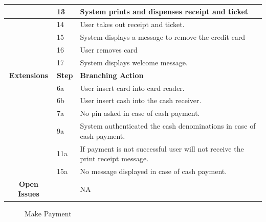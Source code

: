 \documentclass[a4paper,12pt]{report}
\begin{document}
\begin{tabular}{ | c | p{2cm} | p{7cm} |}
	\hline
	&  13  & System prints and dispenses receipt and ticket \\
	\hline
	&  14  & User takes out receipt and ticket. \\
	\hline
	&  15  & System displays a message to remove the credit card \\
	\hline
	&  16  & User removes card \\
	\hline
	&  17  & System displays welcome message. \\
	\hline
	
	\textbf{Extensions} & \textbf{Step} & \textbf{Branching Action} \\
	\hline
	&  6a  & User insert card into card reader. \\
	\hline
	&  6b  & User insert cash into the cash receiver. \\
	\hline
	&  7a  & No pin asked in case of cash payment. \\
	\hline
	&  9a  & System authenticated the cash denominations in case of cash payment. \\
	\hline
	&  11a  & If payment is not successful user will not receive the print receipt message. \\
	\hline
	&  15a  & No message displayed in case of cash payment. \\
	\hline
	\textbf{Open Issues} &    & NA \\
	\hline
	
\end{tabular}


\begin{figure}[!htb]
	\caption{\label{fig:Use Case Model : } Make Payment}	
\end{figure}
\end{document}
